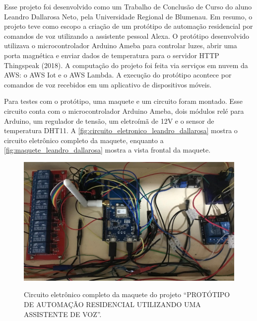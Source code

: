 Esse projeto foi desenvolvido como um Trabalho de Conclusão de Curso do aluno Leandro Dallarosa Neto, pela Universidade Regional de Blumenau. Em resumo, o projeto teve como escopo a criação de um protótipo de automação residencial por comandos de voz utilizando a assistente pessoal Alexa. O protótipo desenvolvido utilizava o microcontrolador Arduino Ameba para controlar luzes, abrir uma porta magnética e enviar dados de temperatura para o servidor HTTP Thingspeak (2018). A computação do projeto foi feita via serviços em nuvem da AWS: o AWS Iot e o AWS Lambda. A execução do protótipo acontece por comandos de voz recebidos em um aplicativo de dispositivos móveis.

Para testes com o protótipo, uma maquete e um circuito foram montado. Esse circuito conta com o microcontrolador Arduino Ameba, dois módulos relé para Arduino, um regulador de tensão, um eletroímã de 12V e o sensor de temperatura DHT11. A \autoref{fig:circuito_eletronico_leandro_dallarosa} mostra o circuito eletrônico completo da maquete, enquanto a \autoref{fig:maquete_leandro_dallarosa} mostra a vista frontal da maquete.

\begin{figure}[htbp]
	\centering
	\caption{Circuito eletrônico completo da maquete do projeto ``PROTÓTIPO DE AUTOMAÇÃO RESIDENCIAL UTILIZANDO UMA ASSISTENTE DE VOZ''.}
	\includegraphics[scale=0.4]{Imagens/circuito_eletronico_leandro_dallarosa.png}
	\label{fig:circuito_eletronico_leandro_dallarosa}
\end{figure}

